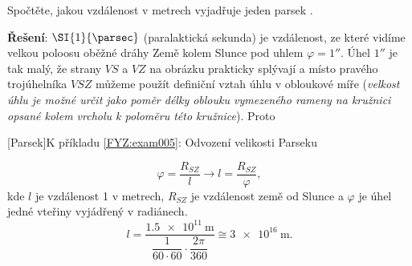 \begin{mdframed}[style=mdexam]
  \begin{example}\label{FYZ:exam005}
    Spočtěte, jakou vzdálenost v metrech vyjadřuje jeden parsek \cite[s.~3]{Kulhanek2009}.
    
    \textbf{Řešení}: \(\SI{1}{\parsec}\) (paralaktická sekunda) je vzdálenost, ze které vidíme 
    velkou poloosu oběžné dráhy Země kolem Slunce pod uhlem \(\varphi = \ang{;;1}\). Úhel 
    \(\ang{;;1}\) je tak malý, že strany \(VS\) a \(VZ\) na obrázku prakticky splývají a místo 
    pravého trojúhelníka $VSZ$ můžeme použít definiční vztah úhlu v obloukové míře (\emph{velkost 
    úhlu je možné určit jako poměr délky oblouku vymezeného rameny na kružnici opsané kolem 
    vrcholu k poloměru této kružnice}). Proto 
    
    {\centering
      \captionsetup{type=figure}
      [Parsek]{K příkladu \ref{FYZ:exam005}: Odvození velikosti Parseku}
      \label{fyz:fig0224}
      \par}
    \begin{equation*}
      \varphi = \frac{R_{SZ}}{l} \rightarrow l = \frac{R_{SZ}}{\varphi},
    \end{equation*}
    kde $l$ je vzdálenost \SI{1}{\parsec} v metrech, $R_{SZ}$ je vzdálenost země od Slunce a 
    $\varphi$ je úhel jedné vteřiny vyjádřený v radiánech. 
    \begin{equation*}
        l = \frac{\SI{1.5e11}{\meter}}{\dfrac{1}{60\cdot60} 
            \cdot\dfrac{2\pi}{360}}\cong \SI{3e16}{\meter}.
    \end{equation*}
  \end{example}
\end{mdframed}